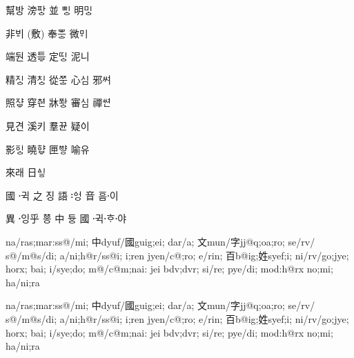 {\oldjamo
幫바ᇰ 滂파ᇰ 並 삐ᇰ 明미ᇰ

非ᄫᅵ (敷)  奉ᄬᅳᇰ 微ᄝᅵ

端둰 透트ᇢ 定띠ᇰ 泥니

精ᅎᅵᇰ 清ᅔᅵᇰ 從ᅏᅮᇰ 心ᄼᅵᆷ 邪ᄽᅧ

照ᅐᅣᇢ 穿ᅕᆑᆫ 牀ᅑᅪᇰ 審ᄾᅵᆷ 禪ᄿᅧᆫ

見견 溪키 羣뀬 疑ᅌᅵ

影ᅙᅵᇰ 曉햐ᇢ 匣ᅘᅣᇹ 喻유

來래 日ᅀᅵᇹ
}

{\oldjamo
國 귁〮 之 징 語 ᅌᅥᆼ〯 音 ᅙᅳᆷ이〮 \par
異 잉〮乎 ᅘᅩᆼ 中 듀ᇰ 國 귁〮ᄒᆞ〮야〮}
    
\ifXeTeX
\oldjamo
\begin{jamotext}
    na/ras;mar:ss@/mi;
    中dyuf/國guig;ei; dar/a;
    文mun/字jj@q;oa;ro; se/rv/ s@/m@s/di; a/ni;h@r/ss@i;
    i;ren jyen/c@;ro; e/rin; 百b@ig;姓syef;i;
    ni/rv/go;jye; horx; bai; i/sye;do;
    m@/c@m;nai: jei bdv;dvr; si/re; pye/di; mod:h@rx no;mi; ha/ni;ra
\end{jamotext}
\fi

\ifLuaTeX
\begin{jamotext}
        na/ras;mar:ss@/mi;
        中dyuf/國guig;ei; dar/a;
        文mun/字jj@q;oa;ro; se/rv/ s@/m@s/di; a/ni;h@r/ss@i;
        i;ren jyen/c@;ro; e/rin; 百b@ig;姓syef;i;
        ni/rv/go;jye; horx; bai; i/sye;do;
        m@/c@m;nai: jei bdv;dvr; si/re; pye/di; mod:h@rx no;mi; ha/ni;ra
\end{jamotext}
\fi